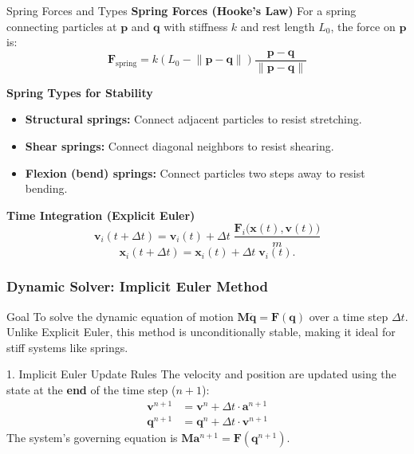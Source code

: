 \documentclass{beamer}
\begin{document}
\begin{frame}[fragile]{Spring Forces and Types}
    \textbf{Spring Forces (Hooke's Law)}
    For a spring connecting particles at $\mathbf{p}$ and $\mathbf{q}$ with stiffness $k$ and rest length $L_0$, the force on $\mathbf{p}$ is:
    \begin{equation} \label{eq:spring_force_slide}
        \mathbf{F}_{\text{spring}} = k (L_0 - \lVert \mathbf{p} - \mathbf{q} \rVert) \frac{\mathbf{p} - \mathbf{q}}{\lVert \mathbf{p} - \mathbf{q} \rVert}
    \end{equation}
    
    \textbf{Spring Types for Stability}
    \begin{itemize}
        \item \textbf{Structural springs:} Connect adjacent particles to resist stretching.
        \item \textbf{Shear springs:} Connect diagonal neighbors to resist shearing.
        \item \textbf{Flexion (bend) springs:} Connect particles two steps away to resist bending.
    \end{itemize}
    
    \textbf{Time Integration (Explicit Euler)}
    \[
      \mathbf{v}_i(t+\Delta t)
        = \mathbf{v}_i(t)
        + \Delta t\;\frac{\mathbf{F}_i\bigl(\mathbf{x}(t),\mathbf{v}(t)\bigr)}{m}
    \]
    \[
      \mathbf{x}_i(t+\Delta t)
        = \mathbf{x}_i(t)
        + \Delta t\;\mathbf{v}_i(t).
    \]
\end{frame}

\begin{frame}[fragile]
    \frametitle{Dynamic Solver: Implicit Euler Method}

    \begin{alertblock}{Goal}
        To solve the dynamic equation of motion $\mathbf{M}\ddot{\mathbf{q}} = \mathbf{F}(\mathbf{q})$ over a time step $\Delta t$. Unlike Explicit Euler, this method is unconditionally stable, making it ideal for stiff systems like springs.
    \end{alertblock}

    \begin{block}{1. Implicit Euler Update Rules}
        The velocity and position are updated using the state at the \textbf{end} of the time step ($n+1$):
        \begin{align*}
            \mathbf{v}^{n+1} &= \mathbf{v}^n + \Delta t \cdot \mathbf{a}^{n+1} \\
            \mathbf{q}^{n+1} &= \mathbf{q}^n + \Delta t \cdot \mathbf{v}^{n+1}
        \end{align*}
        The system's governing equation is $\mathbf{M}\mathbf{a}^{n+1} = \mathbf{F}(\mathbf{q}^{n+1})$.
    \end{block}
\end{frame}
\end{document}
